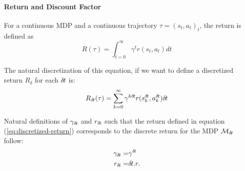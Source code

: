 \paragraph{Return and Discount Factor}
For a continuous MDP and a continuous trajectory $\tau = (s_t, a_t)_t$,
the return is defined as~\cite{cont_rl}
\begin{equation}
	\label{eq:continuous-return}
	R(\tau) = \int_{t=0}^\infty\gamma^tr(s_t, a_t)dt
\end{equation}

The natural discretization of this equation, if we want to define a discretized
return $R_\delta$ for each ${\delta\hspace{-.1em}t}$ is:
\begin{equation}
	\label{eq:discretized-return}
	R_{\delta\hspace{-.1em}t}(\tau) = \sum_{k=0}^\infty\gamma^{k{\delta\hspace{-.1em}t}}
	r(s^{\delta\hspace{-.1em}t}_k, a^{\delta\hspace{-.1em}t}_k){\delta\hspace{-.1em}t}
\end{equation}

Natural definitions of $\gamma_{\delta\hspace{-.1em}t}$ and $r_{\delta\hspace{-.1em}t}$ such
that the return defined in equation (\ref{eq:discretized-return}) corresponds
to the discrete return for the MDP ${\cal M}_{\delta\hspace{-.1em}t}$ follow:
\begin{align}
	\label{eq:def-gamma}
	\gamma_{\delta\hspace{-.1em}t} =& \gamma^{\delta\hspace{-.1em}t}\\
	\label{eq:def-reward}
	r_{\delta\hspace{-.1em}t} =& {\delta\hspace{-.1em}t} . r.
\end{align}



